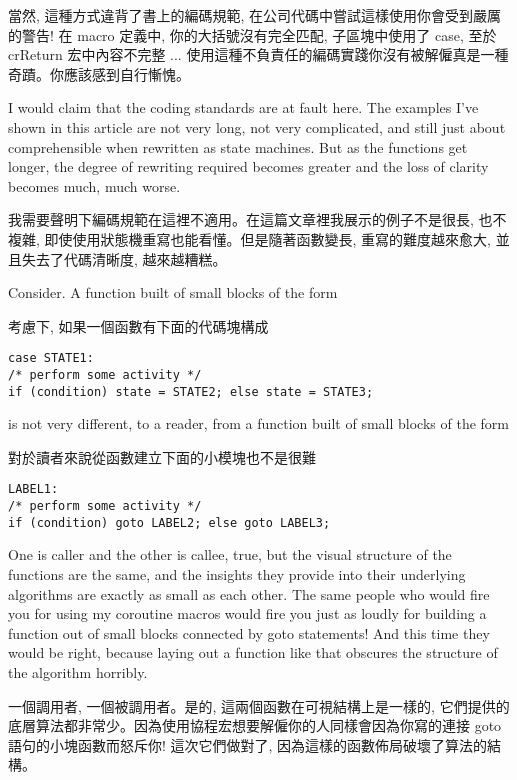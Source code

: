 \documentclass[12pt]{article}
\begin{document}
\begin{CJK}{UTF8}{bsmi}
當然, 這種方式違背了書上的編碼規範, 在公司代碼中嘗試這樣使用你會受到嚴厲的警告! 在 macro 定義中, 你的大括號沒有完全匹配, 子區塊中使用了 case, 至於 crReturn 宏中內容不完整 ... 使用這種不負責任的編碼實踐你沒有被解僱真是一種奇蹟。你應該感到自行慚愧。 

I would claim that the coding standards are at fault here. The examples I've shown in this article are not very long, not very complicated, and still just about comprehensible when rewritten as state machines. But as the functions get longer, the degree of rewriting required becomes greater and the loss of clarity becomes much, much worse.

我需要聲明下編碼規範在這裡不適用。在這篇文章裡我展示的例子不是很長, 也不複雜, 即使使用狀態機重寫也能看懂。但是隨著函數變長, 重寫的難度越來愈大, 並且失去了代碼清晰度, 越來越糟糕。 

Consider. A function built of small blocks of the form

考慮下, 如果一個函數有下面的代碼塊構成 

\begin{lstlisting}[basicstyle=\footnotesize, breaklines=true]
case STATE1:
/* perform some activity */
if (condition) state = STATE2; else state = STATE3;
\end{lstlisting}

is not very different, to a reader, from a function built of small blocks of the form

 對於讀者來說從函數建立下面的小模塊也不是很難 

\begin{lstlisting}[basicstyle=\footnotesize, breaklines=true]
LABEL1:
/* perform some activity */
if (condition) goto LABEL2; else goto LABEL3;
\end{lstlisting}

One is caller and the other is callee, true, but the visual structure of the functions are the same, and the insights they provide into their underlying algorithms are exactly as small as each other. The same people who would fire you for using my coroutine macros would fire you just as loudly for building a function out of small blocks connected by goto statements! And this time they would be right, because laying out a function like that obscures the structure of the algorithm horribly.

 一個調用者, 一個被調用者。是的, 這兩個函數在可視結構上是一樣的, 它們提供的底層算法都非常少。因為使用協程宏想要解僱你的人同樣會因為你寫的連接 goto 語句的小塊函數而怒斥你! 這次它們做對了, 因為這樣的函數佈局破壞了算法的結構。 


\end{CJK}
\end{document}
